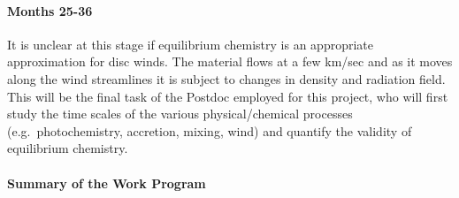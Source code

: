 \documentclass[10pt,fleqn,twoside]{article}
\begin{document}
\paragraph{ Months 25-36}

 It is unclear at this stage
if equilibrium chemistry is an appropriate approximation for disc
winds. The material flows at a few km/sec and as it moves along the
wind streamlines it is subject to changes in density and radiation
field.  This will be the final task of the Postdoc employed for this project, who will first study the time scales of the various physical/chemical processes (e.g.\ photochemistry, accretion, mixing, wind) and quantify the validity of equilibrium chemistry.


\paragraph{Summary of the Work Program}
\end{document}
